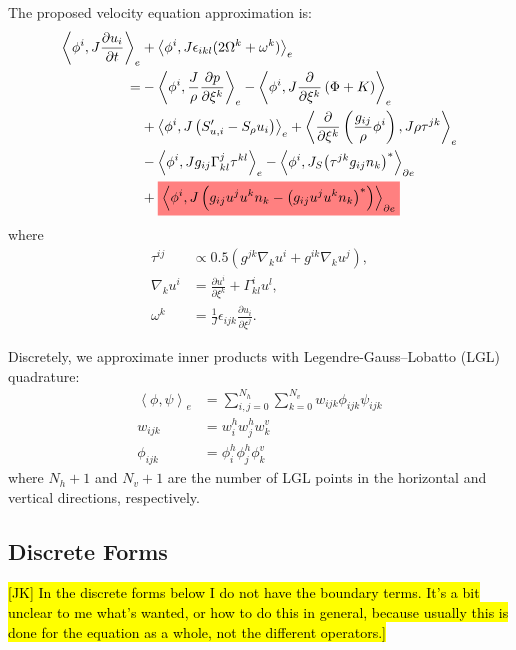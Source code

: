 \documentclass{report}
\newcommand{\inner}[2]{ \left\langle #1, #2 \right\rangle }
\newcommand{\highlight}[1]{\colorbox{red!50}{$\displaystyle#1$}}
\begin{document}
The proposed velocity equation approximation is:
\begin{align}\label{e:var_equations_coord_hor_vert_mome}
    \inner{\phi^i}{J\frac{\partial  u_i}{\partial t}}_{e}&
    + \inner{\phi^i}{J\epsilon_{ikl}(2\Omega^k + \omega^k)}_{e}
    \nonumber\\
    =&
    -\inner{\phi^{i}}{\frac{J}{\rho}\frac{\partial p}{\partial \xi^k}}_{e}
    - \inner{\phi^i}{ J \frac{\partial}{\partial \xi^k} \left(\Phi + K \right)}_{e}
    \nonumber\\
    &
    +\inner{\phi^i }{J\left(S'_{u,i}-S_{\rho}u_i\right)}_{e}
    +\inner{
    \frac{\partial}{\partial \xi^{k}}\left(
    \frac{g_{ij}}{\rho}
    \phi^{i}
    \right)
    }{
    J\rho\tau^{jk}
    }_{e}
    \nonumber\\
    &
    -
    \inner{\phi^{i}}{Jg_{ij} \Gamma_{kl}^{j} \tau^{kl}}_{e}
    -
    \inner{\phi^{i}}{J_{S} {\left(\tau^{jk} g_{ij}n_{k}\right)}^{*}}_{\partial e}
    \nonumber\\
    &
    +
    \highlight{
    \inner{\phi^i}{J
    \left(
    g_{ij}u^{j}u^{k}n_{k}
    -
    {\left(g_{ij}u^{j}u^{k}n_{k}\right)}^{*}
    \right)}_{\partial e}
    }
    \end{align}
    where 
    \begin{align}
    \tau^{ij} &\propto 0.5 (g^{jk} \nabla_k u^i + g^{ik} \nabla_k u^j),\\
    \nabla_k u^i &= \frac{\partial u^i}{\partial \xi^k} + \Gamma_{kl}^i u^{l},\\
    \omega^{k} &= \frac{1}{J} \epsilon_{ijk} \frac{\partial u_{i}}{\partial \xi^{j}}.
\end{align}

Discretely, we approximate inner products with Legendre-Gauss–Lobatto (LGL) quadrature:
\begin{align}
    \inner{\phi}{\psi}_{e} &= \sum_{i,j=0}^{N_h}\sum_{k=0}^{N_v}w_{ijk}\phi_{ijk}\psi_{ijk}\\
    w_{ijk} &= w_i^h w_j^h w_k^v\\
    \phi_{ijk} &= \phi_i^h \phi_j^h \phi_k^v
\end{align}
where $N_h+1$ and $N_v+1$ are the number of LGL points in the horizontal and vertical directions, respectively.

\subsection*{Discrete Forms}

\hl{[JK] In the discrete forms below I do not have the boundary terms.
It's a bit unclear to me what's wanted, or how to do this in general, because
usually this is done for the equation as a whole, not the different operators.]}
\end{document}

